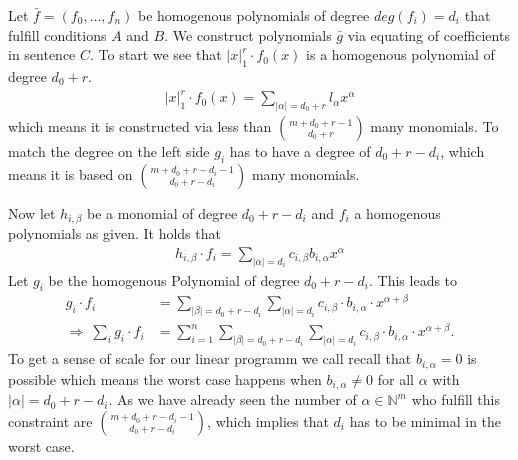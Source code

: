 \documentclass[./main.tex]{subfiles}
\begin{document}
Let $\bar f = (f_0,\dots,f_n)$ be homogenous polynomials of degree $deg(f_i) = d_i$  that fulfill conditions $A$ and $B$. We construct polynomials $\bar g$ via equating of coefficients in sentence $C$. To start we see that $\vert x \vert_1^r \cdot f_0(x)$ is a homogenous polynomial of degree $d_0+r$.
\begin{align*}
\vert x \vert_1^r \cdot f_0(x) = \sum_{\vert \alpha \vert = d_0+r} l_\alpha x^\alpha
\end{align*}
which means it is constructed via less than $\binom{m+ d_0+r -1 }{d_0+r}$ many monomials. To match the degree on the left side $g_i$ has to have a degree of $d_0+r-d_i$, which means it is based on $ \binom {m + d_0+r-d_i-1} {d_0+r-d_i}$ many monomials.

Now let $h_{i,\beta}$ be a monomial of degree $d_0+r-d_i$ and $f_i$ a homogenous polynomials as given. It holds that
\begin{align*}
h_{i,\beta} \cdot f_i = \sum_{\vert \alpha \vert = d_i} c_{i,\beta} b_{i,\alpha} x^\alpha
\end{align*}
Let $g_i$ be the homogenous Polynomial of degree $d_0+r-d_i$. This leads to
\begin{align*}
g_i \cdot f_i &= \sum_{\vert \beta \vert = d_0+r-d_i}  \sum_{\vert \alpha \vert = d_i} c_{i,\beta} \cdot b_{i,\alpha} \cdot x^{\alpha+\beta}\\
\Rightarrow \ \sum_i g_i \cdot f_i &=  \sum_{i=1}^n \sum_{\vert \beta \vert = d_0+r-d_i}  \sum_{\vert \alpha \vert = d_i} c_{i,\beta} \cdot b_{i,\alpha} \cdot x^{\alpha+\beta}.
\end{align*}
To get a sense of scale for our linear programm we call recall that $b_{i,\alpha} = 0 $ is possible which means the worst case happens when  $b_{i,\alpha} \neq 0 $ for all $\alpha$ with $\vert \alpha \vert = d_0+r -d_i$. As we have already seen the number of $\alpha\in \mathbb{N}^m$ who fulfill this constraint are $ \binom {m +d_0+r -d_i -1 } {d_0+r -d_i}$,  which implies that $d_i$ has to be minimal in the worst case.
\end{document}
